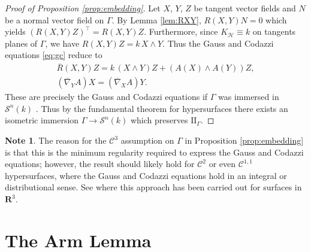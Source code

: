 \documentclass[11pt]{amsart}
\theoremstyle{definition}
\newtheorem{note}[theorem]{Note}
\newcommand{\ol}{\overline}
\newcommand{\R}{\mathbf{R}}
\newcommand{\C}{\mathcal{C}}
\newcommand{\ff}{\mathrm{I\!I}}
\begin{document}
\begin{proof}[Proof of Proposition \ref{prop:embedding}]
Let $X$, $Y$, $Z$ be tangent vector fields and $N$ be a normal vector field on  $\Gamma$.
By Lemma  \ref{lem:RXY}, $R(X,Y)N=0$ which yields $(R(X,Y)Z)^\top=R(X,Y)Z$. Furthermore, since $K_{\mathcal{H}}\equiv k$ on tangents planes of $\Gamma$, we have $R(X,Y)Z=k\,X\wedge Y$.
Thus the Gauss and Codazzi equations \eqref{eq:gc} reduce to
\begin{gather*}
\ol R(X,Y)Z=k\, (X\wedge Y)Z+(A(X)\wedge A(Y))Z,\\
(\ol\nabla_Y A)X=(\ol\nabla_X A)Y.
\end{gather*}
These are precisely the Gauss and Codazzi equations if $\Gamma$ was immersed in $\mathcal{S}^n(k)$  \cite[p. 24]{dajczer1990}. Thus by the fundamental theorem for hypersurfaces \cite[Thm. 2.1(i)]{dajczer1990} there exists an isometric immersion $\Gamma\to\mathcal{S}^n(k)$ which preserves $\ff_\Gamma$.
\end{proof}

\begin{note}\label{note:GC}
The reason for the $\C^3$ assumption on $\Gamma$ in Proposition \ref{prop:embedding} is that this is the minimum regularity required to express the Gauss and Codazzi equations; however, the result should likely hold for $\C^2$ or even $\C^{1,1}$ hypersurfaces, where the Gauss and Codazzi equations hold in an integral or distributional sense. See \cites{hartman-wintner1950, mardare2003} where this approach has been carried out for surfaces in $\R^3$.
\end{note}

\section{The Arm Lemma}\label{sec:schur}
\end{document}
